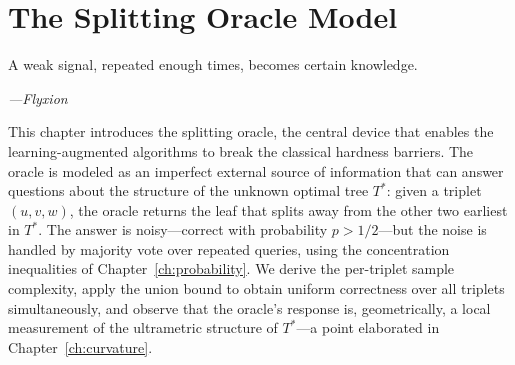 \chapter{The Splitting Oracle Model}
\label{ch:oracle}

\epigraph{%
  A weak signal, repeated enough times, becomes certain knowledge.%
}{\textit{---Flyxion}}

This chapter introduces the splitting oracle, the central device that enables the learning-augmented algorithms to break the classical hardness barriers. The oracle is modeled as an imperfect external source of information that can answer questions about the structure of the unknown optimal tree $T^*$: given a triplet $(u,v,w)$, the oracle returns the leaf that splits away from the other two earliest in $T^*$. The answer is noisy---correct with probability $p > 1/2$---but the noise is handled by majority vote over repeated queries, using the concentration inequalities of Chapter~\ref{ch:probability}. We derive the per-triplet sample complexity, apply the union bound to obtain uniform correctness over all triplets simultaneously, and observe that the oracle's response is, geometrically, a local measurement of the ultrametric structure of $T^*$---a point elaborated in Chapter~\ref{ch:curvature}.

